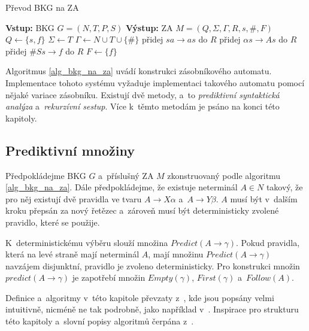 \begin{algorithm}[h]
    \caption{Převod BKG na ZA}
    \label{alg_bkg_na_za}
    \begin{algorithmic}[1]
        \State \textbf{Vstup:} BKG $G = (N, T, P, S)$
        \State \textbf{Výstup:} ZA $M = (Q, \Sigma, \Gamma, R, s, \#, F)$
        \State 
        \State $Q \gets \{s, f\}$
        \State $\Sigma \gets T$
        \State $\Gamma \gets N \cup T \cup \{\#\}$
            \State přidej $sa \rightarrow as$ do $R$
        \EndFor
            \State přidej $\alpha s \rightarrow As$ do $R$
        \EndFor
        \State přidej $\#Ss \rightarrow f$ do $R$
        \State $F \gets \{f\}$
    \end{algorithmic}
\end{algorithm}

Algoritmus \ref{alg_bkg_na_za} uvádí konstrukci zásobníkového automatu.
Implementace tohoto systému vyžaduje implementaci takového automatu pomocí nějaké variace zásobníku.
Existují dvě metody, a~to \emph{prediktivní syntaktická analýza} a~\emph{rekurzívní sestup}.
Více k~těmto metodám je psáno na konci této kapitoly.

\subsection*{Prediktivní množiny}
Předpokládejme BKG $G$ a~příslušný ZA $M$ zkonstruovaný podle algoritmu \ref{alg_bkg_na_za}.
Dále předpokládejme, že existuje neterminál $A \in N$ takový, že pro něj existují dvě pravidla ve tvaru $A \rightarrow X\alpha$ a~$A \rightarrow Y\beta$.
$A$ musí být v~dalším kroku přepsán za nový řetězec a~zároveň musí být deterministicky zvolené pravidlo, které se použije.

K~deterministickému výběru slouží množina $Predict(A \rightarrow \gamma)$.
Pokud pravidla, která na levé straně mají neterminál $A$, mají množinu $Predict(A \rightarrow \gamma)$ navzájem disjunktní, pravidlo je zvoleno deterministicky.
Pro konstrukci množin $predict(A \rightarrow \gamma)$ je zapotřebí množin $Empty(\gamma)$, $First(\gamma)$ a~$Follow(A)$. 

Definice a~algoritmy v~této kapitole převzaty z~\cite{meduna2017sa-shora-dolu,kunda2022}, kde jsou popsány velmi intuitivně, nicméně ne tak podrobně, jako například v~\cite{medunaElementsOfCompDesign}.
Inspirace pro strukturu této kapitoly a~slovní popisy algoritmů čerpána z~\cite{kunda2022}.

